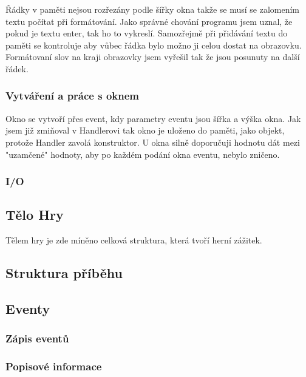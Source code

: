 \documentclass[12pt,a4paper]{article}
\begin{document}
Řádky v paměti nejsou rozřezány podle šířky okna takže se musí se zalomením textu počítat při formátování. Jako správné chování programu jsem uznal, že pokud je textu enter, tak ho to vykreslí. Samozřejmě při přidávání textu do paměti se kontroluje aby vůbec řádka bylo možno ji celou dostat na obrazovku. Formátovaní slov na kraji obrazovky jsem vyřešil tak že jsou posunuty na další řádek.
\subsubsection{Vytváření a práce s oknem}
Okno se vytvoří přes event, kdy parametry eventu jsou šířka a výška okna. Jak jsem již zmiňoval v Handlerovi tak okno je uloženo do paměti, jako objekt, protože Handler zavolá konstruktor. U okna silně doporučuji hodnotu dát mezi "uzamčené" hodnoty, aby po každém podání okna eventu, nebylo zničeno. 
\subsubsection{I/O}
\subsection{Tělo Hry}
Tělem hry je zde míněno celková struktura, která tvoří herní zážitek.
\subsection{Struktura příběhu}
\subsection{Eventy}
\subsubsection{Zápis eventů}
\subsubsection{Popisové informace}
\end{document}
